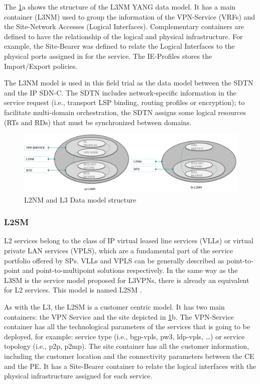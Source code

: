 \documentclass[a4paper,fleqn]{cas-dc}
\begin{document}
The \cref{FIG:l3nm}a shows the structure of the L3NM YANG data model. It has a  main container (L3NM) used to group the information of the VPN-Service (VRFs) and the Site-Network Accesses (Logical Interfaces). Complementary containers are defined to have the relationship of the logical and physical infrastructure. For example, the Site-Bearer was defined to relate the Logical Interfaces to the physical ports assigned in for the service. The IE-Profiles stores the Import/Export policies.  

The L3NM model is used in this field trial as the data model between the SDTN and the IP SDN-C. The SDTN includes network-specific information in the service request (i.e., transport LSP binding, routing profiles or encryption); to facilitate multi-domain orchestration, the SDTN assigns some logical resources (RTs and RDs) that must be synchronized between domains.

\begin{figure}
	\centering
		\includegraphics[scale=0.55]{figs/L3NM_L2NM.png}
	\caption{L2NM and L3 Data model structure}
	\label{FIG:l3nm} 
\end{figure}

\subsubsection{L2SM}
\label{section:l2nm}

L2 services belong to the class of IP virtual leased line services (VLLs) or virtual private LAN services (VPLS)\cite{andersson2006framework}, which are a fundamental part of the service portfolio offered by SPs. VLLs and VPLS can be generally described as point-to-point and point-to-multipoint solutions respectively. In the same way as the L3SM is the service model proposed for L3VPNs, there is already an equivalent for L2 services. This model is named L2SM \cite{wen2018yang}. 

As with the L3, the L2SM is a customer centric model. It has two main containers: the VPN Service and the site depicted in \cref{FIG:l3nm}b. The VPN-Service container has all the technological parameters of the services that is going to be deployed, for example: service type (i.e., bgp-vpls, pw3, ldp-vpls, \dots) or service topology (i.e., p2p, p2mp). The site container has all the customer information, including the customer location and the connectivity parameters between the CE and the PE. It has a Site-Bearer container to relate the logical interfaces with the physical infrastructure assigned for each service.
\end{document}
